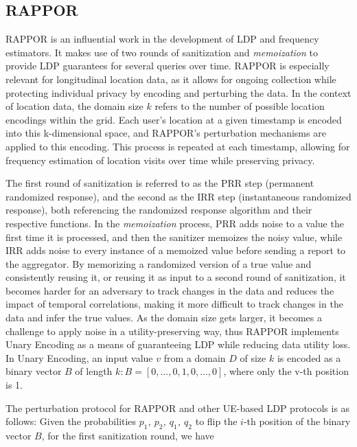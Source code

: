 \subsection{RAPPOR} \label{sec:rappor}
RAPPOR \citep{erlingsson2014rappor} is an influential work in the development of LDP and frequency estimators. It makes use of two rounds of sanitization and \textit{memoization} to provide LDP guarantees for several queries over time. RAPPOR is especially relevant for longitudinal location data, as it allows for ongoing collection while protecting individual privacy by encoding and perturbing the data. In the context of location data, the domain size $k$ refers to the number of possible location encodings within the grid. Each user's location at a given timestamp is encoded into this k-dimensional space, and RAPPOR's perturbation mechanisms are applied to this encoding. This process is repeated at each timestamp, allowing for frequency estimation of location visits over time while preserving privacy. 

The first round of sanitization is referred to as the PRR step (permanent randomized response), and the second as the IRR step (instantaneous randomized response), both referencing the randomized response algorithm and their respective functions. In the \textit{memoization} process, PRR adds noise to a value the first time it is processed, and then the sanitizer memoizes the noisy value, while IRR adds noise to every instance of a memoized value before sending a report to the aggregator. By memorizing a randomized version of a true value and consistently reusing it, or reusing it as input to a second round of sanitization, it becomes harder for an adversary to track changes in the data and reduces the impact of temporal correlations, making it more difficult to track changes in the data and infer the true values. As the domain size gets larger, it becomes a challenge to apply noise in a utility-preserving way, thus RAPPOR implements Unary Encoding as a means of guaranteeing LDP while reducing data utility loss. In Unary Encoding, an input value $v$ from a domain $D$ of size $k$ is encoded as a binary vector $B$ of length $k: B = [0, ..., 0, 1, 0, ..., 0]$, where only the v-th position is 1.

The perturbation protocol for RAPPOR and other UE-based LDP protocols is as follows: Given the probabilities \textit{$p_1$, $p_2$, $q_1$, $q_2$} to flip the $i$-th position of the binary vector $B$, for the first sanitization round, we have 
% 
%

